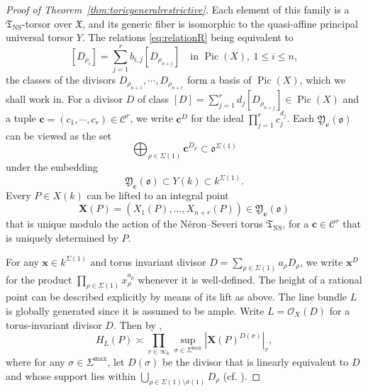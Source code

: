 \documentclass[a4paper, twoside, 11pt]{amsart}
\theoremstyle{definition}
\newcommand{\CO}{{\mathcal{O}}}
\newcommand{\cC}{\mathcal{C}}
\newcommand{\bc}{\boldsymbol{c}}
\newcommand{\bx}{{\boldsymbol{x}}}
\newcommand{\bX}{{\boldsymbol{X}}}
\newcommand{\mT}{\mathfrak{T}}
\newcommand{\mX}{\mathfrak{X}}
\newcommand{\mY}{\mathfrak{Y}}
\newcommand{\fo}{\mathfrak{o}}
\DeclareMathOperator{\Pic}{Pic}
\newcommand{\NS}{\mathrm{NS}}
\begin{document}
\begin{proof}[Proof of Theorem~\ref{thm:toricgeneralrestrictive}]
	Each element of this family is a $\mT_\NS$-torsor over $\mX$, and its generic fiber is isomorphic to the quasi-affine principal universal torsor $Y$.
	The relations \eqref{eq:relationR} being equivalent to 
    \begin{equation}\label{eq:picbasis}
        [D_{\rho_i}]=\sum_{j=1}^r b_{i,j} [D_{\rho_{n+j}}] \quad \text{in }\operatorname{Pic}(X),\ 1\leq i\leq n,
    \end{equation}
    the classes of the divisors $D_{\rho_{n+1}},\cdots,D_{\rho_{n+r}}$ form a basis of $\Pic(X)$, which we shall work in.
	For a divisor $D$ of class $[D]=\sum_{j=1}^{r}d_j[D_{\rho_{n+j}}]\in\Pic(X)$ and a tuple $\bc=(c_1,\cdots,c_r)\in \cC^r$, we write $\bc^D$ for the ideal $\prod_{j=1}^{r}c_j^{d_j}$.
	Each $\mY_{\bc}(\fo)$ can be viewed as the set
	\begin{equation*}
		\bigoplus_{\rho\in\Sigma(1)} \bc^{D_{\rho}}\subset\fo^{\Sigma(1)}
	\end{equation*}
	under the embedding
	\begin{equation*}
		 \mY_{\bc}(\fo) \subset Y(k)\subset k^{\Sigma(1)}.
	\end{equation*}
	Every $P\in X(k)$ can be lifted to an integral point
	\begin{equation*}
		\bX(P) = (X_1(P),\dots, X_{n+r}(P))\in \mY_{\bc}(\fo)
	\end{equation*}
	that is unique modulo the action of the Néron--Severi torus $\mT_{\operatorname{NS}}$,
	for a $\bc\in\cC^r$ that is uniquely determined by $P$.

	For any $\bx\in k^{\Sigma(1)}$ and torus invariant divisor $D=\sum_{\rho\in\Sigma(1)}a_{\rho} D_{\rho}$, we write $\bx^{D}$ for the product $\prod_{\rho\in\Sigma(1)}x_{\rho}^{a_{\rho}}$ whenever it is well-defined. 
	The height of a rational point can be described explicitly by means of its lift as above.
	The line bundle $L$ is globally generated since it is assumed to be ample. Write $L=\CO_X(D)$ for a torus-invariant divisor $D$. Then by \cite[Prop.~3.4]{HuangANT},
    \begin{equation}\label{eq:height}
        H_L(P)\asymp 
        \prod_{v\in\infty_k} \sup_{\sigma\in\Sigma^{\max}}\left|\bX(P)^{D(\sigma)}\right|_{v},
    \end{equation}  where for any $\sigma\in\Sigma^{\max}$, let $D(\sigma)$ be the divisor that is linearly equivalent to $D$ and whose support lies within $\bigcup_{\rho\in \Sigma(1)\setminus\sigma(1)} D_{\rho}$ (cf. \cite[Eq.~(28)]{HuangANT}).
    

\end{proof}
\end{document}
